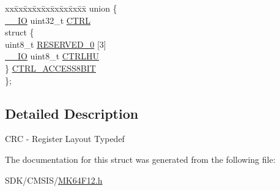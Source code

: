 \begin{DoxyCompactItemize}
\begin{tabbing}
\end{tabbing}\item 
\begin{tabbing}
xx\=xx\=xx\=xx\=xx\=xx\=xx\=xx\=xx\=\kill
union \{\\
\>\mbox{\hyperlink{core__cm4_8h_aec43007d9998a0a0e01faede4133d6be}{\_\_IO}} uint32\_t \mbox{\hyperlink{group___v_r_e_f___peripheral___access___layer_ga15fc8d35f045f329b80c544bef35ff64}{CTRL}}\\
\>struct \{\\
\>\>uint8\_t \mbox{\hyperlink{group___v_r_e_f___peripheral___access___layer_ga6d02c9345b2d39c945c905d46077a0ec}{RESERVED\_0}} \mbox{[}3\mbox{]}\\
\>\>\mbox{\hyperlink{core__cm4_8h_aec43007d9998a0a0e01faede4133d6be}{\_\_IO}} uint8\_t \mbox{\hyperlink{group___v_r_e_f___peripheral___access___layer_ga9fa4d5c80c99d30e4b06313353d2cb9c}{CTRLHU}}\\
\>\} \mbox{\hyperlink{group___v_r_e_f___peripheral___access___layer_ga75b8b170725646f8e8aad949c14b7649}{CTRL\_ACCESS8BIT}}\\
\}; \\

\end{tabbing}\end{DoxyCompactItemize}


\subsection{Detailed Description}
C\+RC -\/ Register Layout Typedef 

The documentation for this struct was generated from the following file\+:\begin{DoxyCompactItemize}
\item 
S\+D\+K/\+C\+M\+S\+I\+S/\mbox{\hyperlink{_m_k64_f12_8h}{M\+K64\+F12.\+h}}\end{DoxyCompactItemize}
